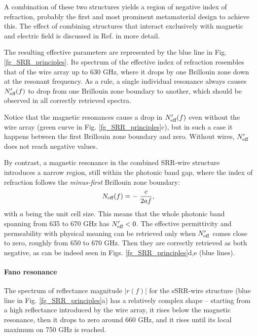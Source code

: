 A combination of these two structures yields a region of negative index of refraction, probably the first \cite{pendry2000negative} and most prominent metamaterial design to achieve this. The effect of combining structures that interact exclusively with magnetic and electric field is discussed in Ref. \cite{koschny2004effective} in more detail.

The resulting effective parameters are represented by the blue line in Fig. \ref{fg_SRR_principles}. Its spectrum of the effective index of refraction resembles that of the wire array up to 630 GHz, where it drops by one Brillouin zone down at the resonant frequency.
As a rule, a single individual resonance always causes $N_{\text{eff} }'(f)$ to drop from one Brillouin zone boundary to another, which should be observed in all correctly retrieved spectra. 

Notice that the magnetic resonances cause a drop in $N_{\text{eff} }'(f)$ even without the wire array (green curve in Fig. \ref{fg_SRR_principles}c), but in such a case it happens between the first Brillouin zone boundary and zero. Without wires, $N_{\text{eff} }'$ does not reach negative values.

By contrast, a magnetic resonance in the combined SRR-wire structure introduces a narrow region, still within the photonic band gap, where the index of refraction follows the \textit{minus-first} Brillouin zone boundary:
\begin{equation} N_{\text{eff} }(f) = -\;\frac{c}{2 a f}, \label{eq_BZN2}\end{equation}
with $a$ being the unit cell size. This means that the whole photonic band spanning from 635 to 670 GHz has $N_{\text{eff} }'<0$. The effective permittivity and permeability with physical meaning can be retrieved only when $N_{\text{eff} }'$ comes close to zero, roughly from 650 to 670 GHz. Then they are correctly retrieved as both negative, as can be indeed seen in Figs. \ref{fg_SRR_principles}d,e (blue lines).

\paragraph{Fano resonance} %
The spectrum of reflectance magnitude $|r(f)|$ for the sSRR-wire structure (blue line in Fig. \ref{fg_SRR_principles}a) has a relatively complex shape -- starting from a high reflectance introduced by the wire array, it rises below the magnetic resonance, then it drops to zero around 660 GHz, and it rises until its local maximum on 750 GHz is reached.

